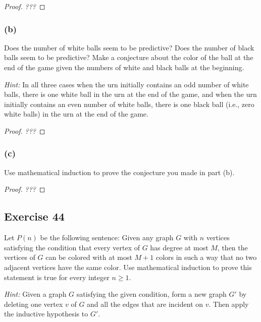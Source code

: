\documentclass[14pt]{extarticle}
\begin{document}
\begin{proof}
{\it ???}
\end{proof}

\subsubsection{(b)}
Does the number of white balls seem to be predictive? Does the number of black balls seem to be predictive? Make a conjecture about the color of the ball at the end of the game given the numbers of white and black balls at the beginning.

{\it Hint:} In all three cases when the urn initially contains an odd number of white balls, there is one white ball in the urn at the end of the game, and when the urn initially contains an even number of white balls, there is one black ball (i.e., zero white balls) in the urn at the end of the game.

\begin{proof}
{\it ???}
\end{proof}

\subsubsection{(c)}
Use mathematical induction to prove the conjecture you made in part (b).

\begin{proof}
{\it ???}
\end{proof}

\subsection{Exercise 44}
Let $P(n)$ be the following sentence: Given any graph $G$ with $n$ vertices satisfying the condition that every vertex of $G$ has degree at most $M$, then the vertices of $G$ can be colored with at most $M + 1$ colors in such a way that no two adjacent vertices have the same color. Use mathematical induction to prove this statement is true for every integer $n \geq 1$.

{\it Hint:} Given a graph $G$ satisfying the given condition, form a new graph $G'$ by deleting one vertex $v$ of $G$ and all the edges that are incident on $v$. Then apply the inductive hypothesis to $G'$.
\end{document}

